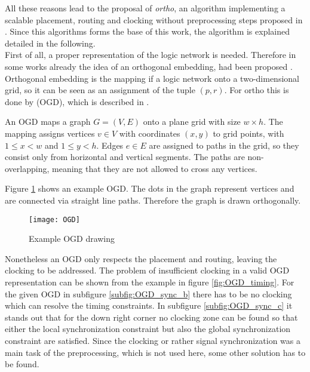 All these reasons lead to the proposal of \textit{ortho}, an algorithm implementing a scalable placement, routing and clocking without preprocessing steps proposed in \cite{ortho}. Since this algorithms forms the base of this work, the algorithm is explained detailed in the following.\\
First of all, a proper representation of the logic network is needed. Therefore in some works already the idea of an orthogonal embedding, had been proposed \cite{dummy_and_buffer_nodes}. Orthogonal embedding is the mapping if a logic network onto a two-dimensional grid, so it can be seen as an assignment of the tuple $(p, r)$. For ortho this is done by  (OGD), which is described in \cite{OGD}.

\begin{definition}
	An OGD maps a graph $G = (V, E)$ onto a plane grid with size $w \times h$. The mapping assigns vertices $v \in V$ with coordinates $(x, y)$ to grid points, with $1 \leq x < w$ and $1 \leq y < h$. Edges $e \in E$ are assigned to paths in the grid, so they consist only from horizontal and vertical segments. The paths are non-overlapping, meaning that they are not allowed to cross any vertices.
\end{definition}

Figure \ref{fig:OGD_example} shows an example OGD. The dots in the graph represent vertices and are connected via straight line paths. Therefore the graph is drawn orthogonally.

\begin{figure}
	\centering
	\texttt{[image: OGD]}
	\caption{Example OGD drawing}\label{fig:OGD_example}
\end{figure}

Nonetheless an OGD only respects the placement and routing, leaving the clocking to be addressed. The problem of insufficient clocking in a valid OGD representation can be shown from the example in figure \ref{fig:OGD_timing}. For the given OGD in subfigure \ref{subfig:OGD_sync_b} there has to be no clocking which can resolve the timing constraints. In subfigure \ref{subfig:OGD_sync_c} it stands out that for the down right corner no clocking zone can be found so that either the local synchronization constraint but also the global synchronization constraint are satisfied. Since the clocking or rather signal synchronization was a main task of the preprocessing, which is not used here, some other solution has to be found.


